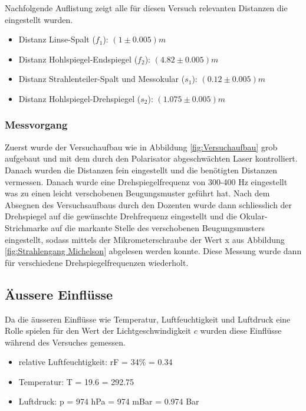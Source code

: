 Nachfolgende Auflistung zeigt alle für diesen Versuch relevanten Distanzen die eingestellt wurden.

\begin{itemize}
\item Distanz Linse-Spalt ($f_{1}$): $(1\pm 0.005)m$
\item Distanz Hohlspiegel-Endspiegel ($f_{2}$): $(4.82\pm 0.005)m$
\item Distanz Strahlenteiler-Spalt und Messokular ($s_{1}$): $(0.12\pm 0.005)m$
\item Distanz Hohlspiegel-Drehspiegel ($s_{2}$): $(1.075\pm 0.005)m$
\end{itemize}

\subsubsection{Messvorgang}

Zuerst wurde der Versuchaufbau wie in Abbildung \ref{fig:Versuchaufbau} grob aufgebaut und mit dem durch den Polarisator abgeschwächten Laser kontrolliert. Danach wurden die Distanzen fein eingestellt und die benötigten Distanzen vermessen. Danach wurde eine Drehspiegelfrequenz von 300-400 Hz eingestellt was zu einen leicht verschobenen Beugungsmuster geführt hat. Nach dem Absegnen des Versuchsaufbaus durch den Dozenten wurde dann schliesslich der Drehspiegel auf die gewünschte Drehfrequenz eingestellt und die Okular-Strichmarke auf die markante Stelle des verschobenen Beugungsmusters eingestellt, sodass mittels der Mikrometerschraube der Wert x aus Abbildung \ref{fig:Strahlengang Michelson} abgelesen werden konnte. Diese Messung wurde dann für verschiedene Drehspiegelfrequenzen wiederholt.

\subsection{Äussere Einflüsse}
\label{sec:Äussere Einflüsse}

Da die äusseren Einflüsse wie Temperatur, Luftfeuchtigkeit und Luftdruck eine Rolle spielen für den Wert der Lichtgeschwindigkeit $c$ wurden diese Einflüsse während des Versuches gemessen.

\begin{itemize}
\item relative Luftfeuchtigkeit: rF = 34\% = 0.34
\item Temperatur: T = 19.6 = 292.75
\item Luftdruck: p = 974 hPa = 974 mBar = 0.974 Bar
\end{itemize}

